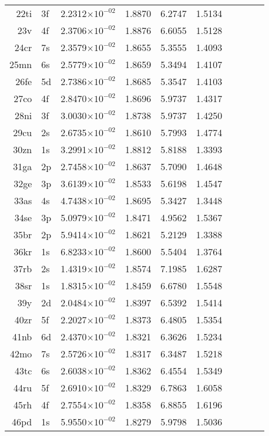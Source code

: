 \documentclass[12pt]{book}
\begin{document}
\begin{center}
\begin{longtable}{r l l l l l l l l l}
	22ti	&	3f	&	2.2312$\times10^{-02}$	&	1.8870	&	6.2747	&	1.5134 \\
	23v	  &	4f	&	2.3706$\times10^{-02}$	&	1.8876	&	6.6055	&	1.5128 \\
	24cr	&	7s	&	2.3579$\times10^{-02}$	&	1.8655	&	5.3555	&	1.4093 \\
	25mn&	6s	&	2.5779$\times10^{-02}$	&	1.8659	&	5.3494	&	1.4107 \\
	26fe	&	5d	&	2.7386$\times10^{-02}$	&	1.8685	&	5.3547	&	1.4103 \\
	27co	&	4f	&	2.8470$\times10^{-02}$	&	1.8696	&	5.9737	&	1.4317 \\
	28ni	&	3f	&	3.0030$\times10^{-02}$	&	1.8738	&	5.9737	&	1.4250 \\
	29cu	&	2s	&	2.6735$\times10^{-02}$	&	1.8610	&	5.7993	&	1.4774 \\
	30zn	&	1s	&	3.2991$\times10^{-02}$	&	1.8812	&	5.8188	&	1.3393 \\
	31ga	&	2p	&	2.7458$\times10^{-02}$	&	1.8637	&	5.7090	&	1.4648 \\
	32ge	&	3p	&	3.6139$\times10^{-02}$	&	1.8533	&	5.6198	&	1.4547 \\
	33as	&	4s	&	4.7438$\times10^{-02}$	&	1.8695	&	5.3427	&	1.3448 \\
	34se	&	3p	&	5.0979$\times10^{-02}$	&	1.8471	&	4.9562	&	1.5367 \\
	35br	&	2p	&	5.9414$\times10^{-02}$	&	1.8621	&	5.2129	&	1.3388 \\
	36kr	&	1s	&	6.8233$\times10^{-02}$	&	1.8600	&	5.5404	&	1.3764 \\
	37rb	&	2s	&	1.4319$\times10^{-02}$	&	1.8574	&	7.1985	&	1.6287 \\
	38sr	&	1s	&	1.8315$\times10^{-02}$	&	1.8459	&	6.6780	&	1.5548 \\
	39y	&	2d	&	2.0484$\times10^{-02}$	&	1.8397	&	6.5392	&	1.5414 \\
	40zr	&	5f	&	2.2027$\times10^{-02}$	&	1.8373	&	6.4805	&	1.5354 \\
	41nb	&	6d	&	2.4370$\times10^{-02}$	&	1.8321	&	6.3626	&	1.5234 \\
	42mo&	7s	&	2.5726$\times10^{-02}$	&	1.8317	&	6.3487	&	1.5218 \\
	43tc	&	6s	&	2.6038$\times10^{-02}$	&	1.8362	&	6.4554	&	1.5349 \\
	44ru	&	5f	&	2.6910$\times10^{-02}$	&	1.8329	&	6.7863	&	1.6058 \\
	45rh	&	4f	&	2.7554$\times10^{-02}$	&	1.8358	&	6.8855	&	1.6196 \\
	46pd	&	1s	&	5.9550$\times10^{-02}$	&	1.8279	&	5.9798	&	1.5036 \\

\end{longtable}
\end{center}
\end{document}

